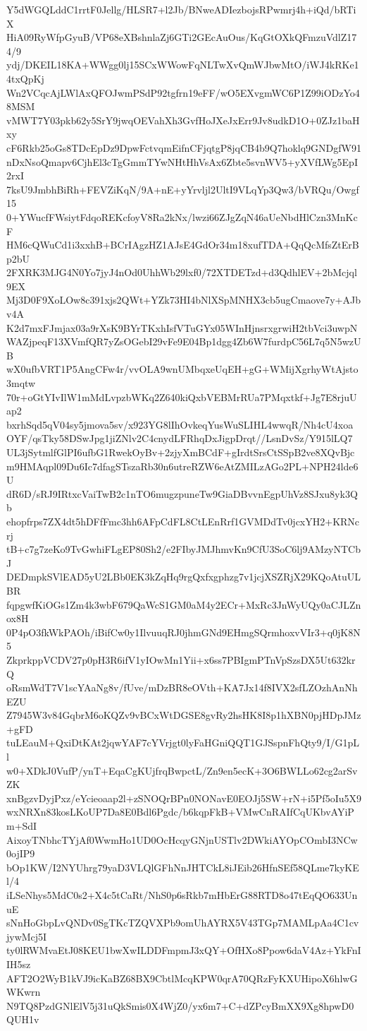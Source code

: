 Y5dWGQLddC1rrtF0Jellg/HLSR7+l2Jb/BNweADIezbojsRPwmrj4h+iQd/bRTiX
HiA09RyWfpGyuB/VP68eXBshnlaZj6GTi2GEcAuOus/KqGtOXkQFmzuVdlZ174/9
ydj/DKEIL18KA+WWgg0lj15SCxWWowFqNLTwXvQmWJbwMtO/iWJ4kRKe14txQpKj
Wn2VCqcAjLWlAxQFOJwmPSdP92tgfrn19eFF/wO5EXvgmWC6P1Z99iODzYo48MSM
vMWT7Y03pkb62y5SrY9jwqOEVahXh3GvfHoJXeJxErr9Jv8udkD1O+0ZJz1baHxy
cF6Rkb25oGs8TDcEpDz9DpwFctvqmEifnCFjqtgP8jqCB4b9Q7hoklq9GNDgfW91
nDxNsoQmapv6CjhEl3cTgGmmTYwNHtHhVsAx6Zbte5svnWV5+yXVfLWg5EpI2rxI
7ksU9JmbhBiRh+FEVZiKqN/9A+nE+yYrvljl2UltI9VLqYp3Qw3/bVRQu/Owgf15
0+YWucfFWsiytFdqoREKcfoyV8Ra2kNx/lwzi66ZJgZqN46aUeNbdHlCzn3MnKcF
HM6cQWuCd1i3xxhB+BCrIAgzHZ1AJsE4GdOr34m18xufTDA+QqQcMfsZtErBp2bU
2FXRK3MJG4N0Yo7jyJ4nOd0UhhWb29lxf0/72XTDETzd+d3QdhlEV+2bMcjql9EX
Mj3D0F9XoLOw8c391xjs2QWt+YZk73HI4bNlXSpMNHX3cb5ugCmaove7y+AJbv4A
K2d7mxFJmjax03a9rXsK9BYrTKxhIsfVTuGYx05WInHjnsrxgrwiH2tbVci3uwpN
WAZjpeqF13XVmfQR7yZsOGebI29vFe9E04Bp1dgg4Zb6W7furdpC56L7q5N5wzUB
wX0ufbVRT1P5AngCFw4r/vvOLA9wnUMbqxeUqEH+gG+WMijXgrhyWtAjsto3mqtw
70r+oGtYIvIlW1mMdLvpzbWKq2Z640kiQxbVEBMrRUa7PMqxtkf+Jg7E8rjuUap2
bxrhSqd5qV04sy5jmova5sv/x923YG8lIhOvkeqYusWuSLIHL4wwqR/Nh4cU4xoa
OYF/qsTky58DSwJpg1jiZNlv2C4cnydLFRhqDxJigpDrqt//LsnDvSz/Y915lLQ7
UL3jSytmlfGlPI6ufbG1RwekOyBv+2zjyXmBCdF+gIrdtSrsCtSSpB2ve8XQvBjc
m9HMAqpl09Du6Ic7dfagSTszaRb30n6utreRZW6eAtZMILzAGo2PL+NPH24lde6U
dR6D/sRJ9IRtxcVaiTwB2c1nTO6mugzpuneTw9GiaDBvvnEgpUhVz8SJxu8yk3Qb
ehopfrps7ZX4dt5hDFfFmc3hh6AFpCdFL8CtLEnRrf1GVMDdTv0jcxYH2+KRNcrj
tB+c7g7zeKo9TvGwhiFLgEP80Sh2/e2FIbyJMJhmvKn9CfU3SoC6lj9AMzyNTCbJ
DEDmpkSVlEAD5yU2LBb0EK3kZqHq9rgQxfxgphzg7v1jcjXSZRjX29KQoAtuULBR
fqpgwfKiOGs1Zm4k3wbF679QaWcS1GM0aM4y2ECr+MxRc3JnWyUQy0aCJLZnox8H
0P4pO3fkWkPAOh/iBifCw0y1IlvuuqRJ0jhmGNd9EHmgSQrmhoxvVIr3+q0jK8N5
ZkprkppVCDV27p0pH3R6ifV1yIOwMn1Yii+x6ss7PBIgmPTnVpSzsDX5Ut632krQ
oRsmWdT7V1scYAaNg8v/fUve/mDzBR8eOVth+KA7Jx14f8IVX2sfLZOzhAnNhEZU
Z7945W3v84GqbrM6oKQZv9vBCxWtDGSE8gvRy2hsHK8I8p1hXBN0pjHDpJMz+gFD
tuLEauM+QxiDtKAt2jqwYAF7cYVrjgt0lyFaHGniQQT1GJSspnFhQty9/I/G1pLl
w0+XDkJ0VufP/ynT+EqaCgKUjfrqBwpctL/Zn9en5ecK+3O6BWLLo62cg2arSvZK
xnBgzvDyjPxz/eYcieoaap2l+zSNOQrBPn0NONavE0EOJj5SW+rN+i5Pf5oIu5X9
wxNRXn83kosLKoUP7Da8E0Bdl6Pgdc/b6kqpFkB+VMwCnRAIfCqUKbvAYiPm+SdI
AixoyTNbhcTYjAf0WwmHo1UD0OcHcqyGNjnUSTlv2DWkiAYOpCOmbI3NCw0ojIP9
bOp1KW/I2NYUhrg79yaD3VLQlGFhNnJHTCkL8iJEib26HfnSEf58QLme7kyKEl/4
iLSeNhys5MdC0s2+X4c5tCaRt/NhS0p6sRkb7mHbErG88RTD8o47tEqQO633UnuE
sNnHoGbpLvQNDv0SgTKcTZQVXPb9omUhAYRX5V43TGp7MAMLpAa4C1cvjywMcj5I
ty0lRWMvaEtJ08KEU1bwXwILDDFmpmJ3xQY+OfHXo8Ppow6daV4Az+YkFnIIH5sz
AFT2O2WyB1kVJ9icKaBZ68BX9CbtlMcqKPW0qrA70QRzFyKXUHipoX6hlwGWKwrn
N9TQ8PzdGNlElV5j31uQkSmis0X4WjZ0/yx6m7+C+dZPcyBmXX9Xg8hpwD0QUH1v
